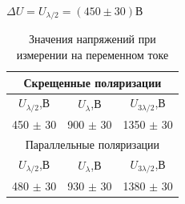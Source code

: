 \documentclass[a4paper,12pt]{article}
\begin{document}
\begin{enumerate}
    $\Delta U=U_{\lambda/2}=(450\pm 30)$В

    \begin{table}[h!]
    \centering
    \begin{tabular}{|c|c|c|}
         \hline
         \multicolumn{3}{|c|}{Скрещенные поляризации} \\ \hline
         $U_{\lambda/2}$,В & $U_{\lambda}$,В & $U_{3\lambda/2}$,В  \\ \hline
         450 $\pm$ 30 & 900 $\pm$ 30 & 1350 $\pm$ 30 \\ \hline 
         \multicolumn{3}{|c|}{Параллельные поляризации} \\ \hline
         $U_{\lambda/2}$,В & $U_{\lambda}$,В & $U_{3\lambda/2}$,В  \\ \hline
         480 $\pm$ 30 & 930 $\pm$ 30 & 1380 $\pm$ 30 \\ \hline
    \end{tabular}
    \caption{Значения напряжений при измерении на переменном токе}
    \label{tab:3}
    \end{table}


\end{enumerate}
\end{document}
